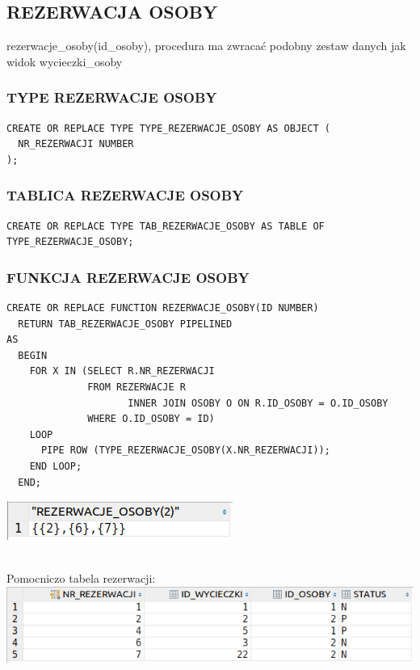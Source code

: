 \subsection{REZERWACJA OSOBY}
rezerwacje\_osoby(id\_osoby), procedura ma zwracać podobny zestaw danych jak widok
wycieczki\_osoby

\subsubsection{TYPE REZERWACJE OSOBY}
\begin{verbatim}
CREATE OR REPLACE TYPE TYPE_REZERWACJE_OSOBY AS OBJECT (
  NR_REZERWACJI NUMBER
);
\end{verbatim}

\subsubsection{TABLICA REZERWACJE OSOBY}
\begin{verbatim}
CREATE OR REPLACE TYPE TAB_REZERWACJE_OSOBY AS TABLE OF TYPE_REZERWACJE_OSOBY;
\end{verbatim}

\subsubsection{FUNKCJA REZERWACJE OSOBY}
\begin{verbatim}
CREATE OR REPLACE FUNCTION REZERWACJE_OSOBY(ID NUMBER)
  RETURN TAB_REZERWACJE_OSOBY PIPELINED
AS
  BEGIN
    FOR X IN (SELECT R.NR_REZERWACJI
              FROM REZERWACJE R
                     INNER JOIN OSOBY O ON R.ID_OSOBY = O.ID_OSOBY
              WHERE O.ID_OSOBY = ID)
    LOOP
      PIPE ROW (TYPE_REZERWACJE_OSOBY(X.NR_REZERWACJI));
    END LOOP;
  END;
\end{verbatim}

\begin{minipage}{0.40\textwidth}
\includegraphics[width=\linewidth]{./images/rezerwacje_osoby.png}
\end{minipage}\\
Pomocniczo tabela rezerwacji:\\ 
\includegraphics[width=\linewidth]{./images/przyszle_rezerwacje_osoby_rezerwacje.png}

